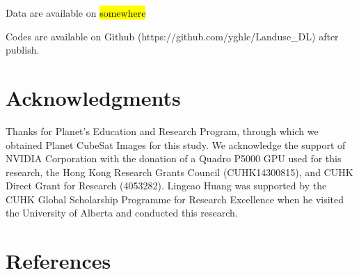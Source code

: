 \documentclass[preprint,12pt,authoryear]{elsarticle}
\begin{document}
Data are available on \hl{somewhere}  %

Codes are available on Github (https://github.com/yghlc/Landuse\_DL) after publish. 

\section{Acknowledgments}
\label{sec_acknowledgments}

Thanks for Planet’s Education and Research Program, through which we obtained Planet CubeSat Images for this study. We acknowledge the support of NVIDIA Corporation with the donation of a Quadro P5000 GPU used for this research, the Hong Kong Research Grants Council (CUHK14300815), and CUHK Direct Grant for Research (4053282). Lingcao Huang was supported by the CUHK Global Scholarship Programme for Research Excellence when he visited the University of Alberta and conducted this research.





\section{References}
\label{sec_reference}

 



%
%
\end{document}
